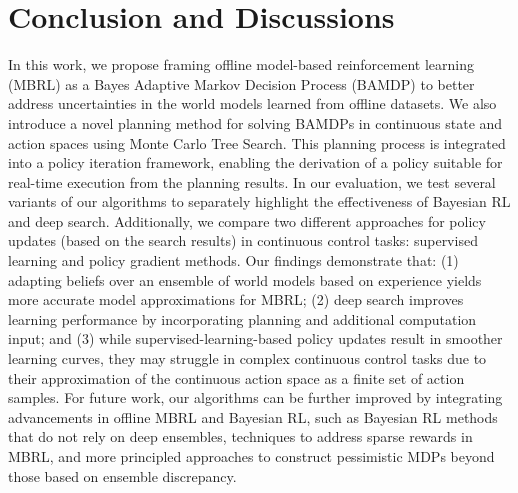 \section{Conclusion and Discussions}

In this work, we propose framing offline model-based reinforcement learning (MBRL) as a Bayes Adaptive Markov Decision Process (BAMDP) to better address uncertainties in the world models learned from offline datasets. We also introduce a novel planning method for solving BAMDPs in continuous state and action spaces using Monte Carlo Tree Search. This planning process is integrated into a policy iteration framework, enabling the derivation of a policy suitable for real-time execution from the planning results. In our evaluation, we test several variants of our algorithms to separately highlight the effectiveness of Bayesian RL and deep search. Additionally, we compare two different approaches for policy updates (based on the search results) in continuous control tasks: supervised learning and policy gradient methods. Our findings demonstrate that: (1) adapting beliefs over an ensemble of world models based on experience yields more accurate model approximations for MBRL; (2) deep search improves learning performance by incorporating planning and additional computation input; and (3) while supervised-learning-based policy updates result in smoother learning curves, they may struggle in complex continuous control tasks due to their approximation of the continuous action space as a finite set of action samples. For future work, our algorithms can be further improved by integrating advancements in offline MBRL and Bayesian RL, such as Bayesian RL methods that do not rely on deep ensembles, techniques to address sparse rewards in MBRL, and more principled approaches to construct pessimistic MDPs beyond those based on ensemble discrepancy.